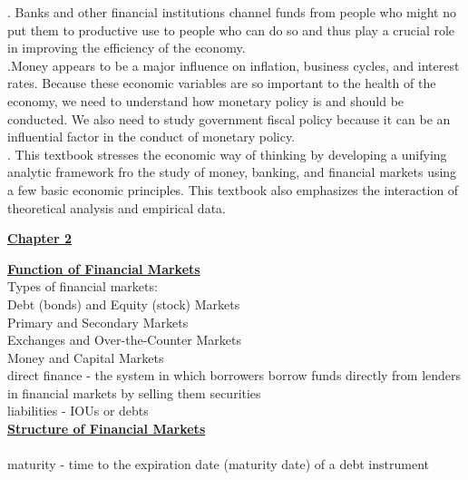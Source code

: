 \documentclass[12pt]{article}
\begin{document}
. Banks and other financial institutions channel funds from people who might no put them to productive use to people who can do so
and thus play a crucial role in improving the efficiency of the economy.\\

 .Money appears to be a major influence on inflation, business cycles, and interest rates. Because these economic variables are so important to 
the health of the economy, we need to understand how monetary policy is and should be conducted. We also need to study government fiscal policy
because it can be an influential factor in the conduct of monetary policy. \\

. This textbook stresses the economic way of thinking by developing a unifying analytic framework fro the study of money, banking, and financial
markets using a few basic economic principles. This textbook also emphasizes the interaction of theoretical analysis and empirical data.\\

\newpage

\begin{center}
\underline{\bf \huge Chapter 2}
\end{center}

\noindent \underline{\bf Function of Financial Markets} \\

\noindent Types of financial markets: \\
\indent Debt (bonds) and Equity (stock) Markets\\
\indent Primary and Secondary Markets\\
\indent Exchanges and Over-the-Counter Markets\\
\indent Money and Capital Markets\\

\noindent direct finance - the system in which borrowers borrow funds directly from lenders in financial markets by selling them securities \\

\noindent liabilities - IOUs or debts\\

\noindent \underline{\bf Structure of Financial Markets}\\

\\

\noindent maturity - time to the expiration date (maturity date) of a debt instrument\\
\end{document}
